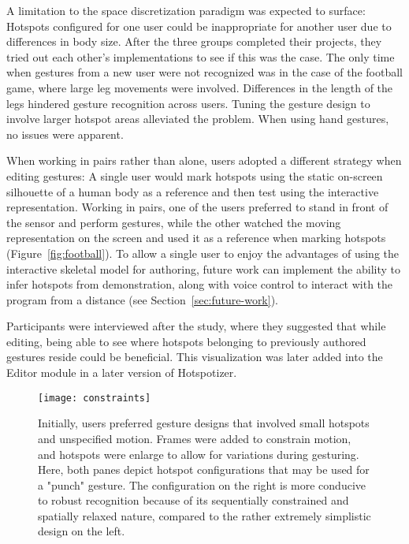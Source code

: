 A limitation to the space discretization paradigm was expected to surface: Hotspots configured for one user could be inappropriate for another user due to differences in body size. After the three groups completed their projects, they tried out each other’s implementations to see if this was the case. The only time when gestures from a new user were not recognized was in the case of the football game, where large leg movements were involved. Differences in the length of the legs hindered gesture recognition across users. Tuning the gesture design to involve larger hotspot areas alleviated the problem. When using hand gestures, no issues were apparent.

When working in pairs rather than alone, users adopted a different strategy when editing gestures: A single user would mark hotspots using the static on-screen silhouette of a human body as a reference and then test using the interactive representation. Working in pairs, one of the users preferred to stand in front of the sensor and perform gestures, while the other watched the moving representation on the screen and used it as a reference when marking hotspots (Figure~\ref{fig:football}). To allow a single user to enjoy the advantages of using the interactive skeletal model for authoring, future work can implement the ability to infer hotspots from demonstration, along with voice control to interact with the program from a distance (see Section~\ref{sec:future-work}).

Participants were interviewed after the study, where they suggested that while editing, being able to see where hotspots belonging to previously authored gestures reside could be beneficial. This visualization was later added into the Editor module in a later version of Hotspotizer.

\begin{SCfigure}[\sidecaptionrelwidth][t]
\centering
\texttt{[image: constraints]}
\caption{Initially, users preferred gesture designs that involved small hotspots and unspecified motion. Frames were added to constrain motion, and hotspots were enlarge to allow for variations during gesturing. Here, both panes depict hotspot configurations that may be used for a "punch" gesture. The configuration on the right is more conducive to robust recognition because of its sequentially constrained and spatially relaxed nature, compared to the rather extremely simplistic design on the left.}
\label{fig:constraints}
\end{SCfigure}

